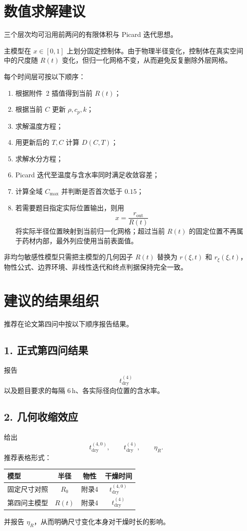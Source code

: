 \documentclass[UTF8,a4paper,12pt]{ctexart}
\begin{document}
\section{数值求解建议}

三个层次均可沿用前两问的有限体积与 Picard 迭代思想。

主模型在 $x\in[0,1]$ 上划分固定控制体。由于物理半径变化，控制体在真实空间中的尺度随 $R(t)$ 变化，但归一化网格不变，从而避免反复删除外层网格。

每个时间层可按以下顺序：
\begin{enumerate}[label=(\arabic*)]
    \item 根据附件~2 插值得到当前 $R(t)$；
    \item 根据当前 $C$ 更新 $\rho,c_p,k$；
    \item 求解温度方程；
    \item 用更新后的 $T,C$ 计算 $D(C,T)$；
    \item 求解水分方程；
    \item Picard 迭代至温度与含水率同时满足收敛容差；
    \item 计算全域 $C_{\max}$ 并判断是否首次低于 $0.15$；
    \item 若需要题目指定实际位置输出，则用
    \[
    x=\frac{r_{\mathrm{out}}}{R(t)}
    \]
    将实际半径位置映射到当前归一化网格；超过当前 $R(t)$ 的固定位置不再属于药材内部，最外列应使用当前表面值。
\end{enumerate}

非均匀敏感性模型只需把主模型的几何因子 $R(t)$ 替换为 $r(\xi,t)$ 和 $r_\xi(\xi,t)$，物性公式、边界环境、非线性迭代和终点判据保持完全一致。

\section{建议的结果组织}

推荐在论文第四问中按以下顺序报告结果。

\subsection*{1. 正式第四问结果}
报告
\[
t_{\mathrm{dry}}^{(4)}
\]
以及题目要求的每隔 $6\,\mathrm{h}$、各实际径向位置的含水率。

\subsection*{2. 几何收缩效应}
给出
\[
t_{\mathrm{dry}}^{(4,0)},\qquad
 t_{\mathrm{dry}}^{(4)},\qquad
\eta_R.
\]
推荐表格形式：
\begin{center}
\begin{tabular}{lccc}
\toprule
模型 & 半径 & 物性 & 干燥时间 \\
\midrule
固定尺寸对照 & $R_0$ & 附录4 & $t_{\mathrm{dry}}^{(4,0)}$ \\
第四问主模型 & $R(t)$ & 附录4 & $t_{\mathrm{dry}}^{(4)}$ \\
\bottomrule
\end{tabular}
\end{center}
并报告 $\eta_R$，从而明确尺寸变化本身对干燥时长的影响。
\end{document}
